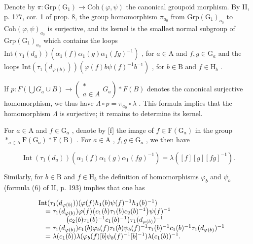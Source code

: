 Denote by \(\pi\colon\mathrm{Grp}(\mathrm{G}_{1})\to\mathrm{Coh}(\varphi,\psi)\) the canonical groupoid morphism. By II, p. 177, cor. 1 of prop. 8, the group homomorphism \(\pi_{a_{0}}\) from \(\mathrm{Grp}(\mathrm{G}_{1})_{a_{0}}\) to \(\mathrm{Coh}(\varphi,\psi)_{a_{0}}\) is surjective, and its kernel is the smallest normal subgroup of \(\mathrm{Grp}(\mathrm{G}_{1})_{a_{0}}\) which contains the loops \(\mathrm{Int}(\tau_{1}(d_{a}))( \alpha_{1}(f)\alpha_{1}(g)\alpha_{1}(fg)^{-1})\) , for \(a\in\mathrm{A}\) and \(f,g\in\mathrm{G}_{a}\) and the loops \(\mathrm{Int}(\tau_{1}(d_{\varphi(b)}))( \varphi(f)b\psi(f)^{-1}b^{-1})\) , for \(b\in\mathrm{B}\) and \(f\in\mathrm{H}_{b}\) .

If \(p\colon F(\bigcup G_{a}\cup B)\to \left( \begin{array}{c} *\\ a\in A \end{array}G_{a}\right)*F(B)\) denotes the canonical surjective homomorphism, we thus have \(\Lambda \circ p = \pi_{a_0}\circ \lambda\) . This formula implies that the homomorphism \(\Lambda\) is surjective; it remains to determine its kernel.

For \(a \in \mathrm{A}\) and \(f \in \mathrm{G}_a\) , denote by {[}f{]} the image of \(f \in \mathrm{F}(\mathrm{G}_a)\) in the group \(*_{a \in \mathrm{A}} \mathrm{F}(\mathrm{G}_a) * \mathrm{F}(\mathrm{B})\) . For \(a \in \mathrm{A}\) , \(f, g \in \mathrm{G}_a\) , we then have

\[
\operatorname{Int} \left(\tau_ {1} \left(d _ {a}\right)\right) \left(\alpha_ {1} (f) \alpha_ {1} (g) \alpha_ {1} (f g) ^ {- 1}\right) = \lambda ([ f ] [ g ] [ f g ] ^ {- 1}).
\]

Similarly, for \(b \in \mathrm{B}\) and \(f \in \mathrm{H}_b\) the definition of homomorphisms \(\varphi_b\) and \(\psi_b\) (formula (6) of II, p. 193) implies that one has

\[
\begin{array}{r l} & {\mathrm{Int} (\tau_ {1} (d _ {\varphi (b)})) (\varphi (f) h _ {1} (b) \psi (f) ^ {- 1} h _ {1} (b) ^ {- 1})} \\ & {\quad = \tau_ {1} (d _ {\varphi (b)}) \varphi (f) \big (c _ {1} (b) \tau_ {1} (b) c _ {2} (b) ^ {- 1} \big) \psi (f) ^ {- 1}} \\ & {\qquad \qquad \big (c _ {2} (b) \tau_ {1} (b) ^ {- 1} c _ {1} (b) ^ {- 1} \big) \tau_ {1} (d _ {\varphi (b)}) ^ {- 1}} \\ & {\quad = \tau_ {1} (d _ {\varphi (b)}) c _ {1} (b) \varphi_ {b} (f) \tau_ {1} (b) \psi_ {b} (f) ^ {- 1} \tau_ {1} (b) ^ {- 1} c _ {1} (b) ^ {- 1} \tau_ {1} (d _ {\varphi (b)}) ^ {- 1}} \\ & {\quad = \lambda (c _ {1} (b)) \lambda (\varphi_ {b} (f) [ b ] \psi_ {b} (f) ^ {- 1} [ b ] ^ {- 1}) \lambda (c _ {1} (b)) ^ {- 1}.} \end{array}
\]

